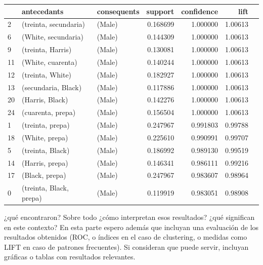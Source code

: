 \documentclass[sigconf]{acmart}
\begin{document}
\begin{table}[bt]
\begin{tabular}{lllrrrr}
\toprule
{} &              antecedants & consequents &   support &  confidence &  lift\\
\midrule
2  &    (treinta, secundaria) &      (Male) &  0.168699 &    1.000000 &  1.00613\\
6  &      (White, secundaria) &      (Male) &  0.144309 &    1.000000 &  1.00613 \\
9  &        (treinta, Harris) &      (Male) &  0.130081 &    1.000000 &  1.00613 \\
11 &        (White, cuarenta) &      (Male) &  0.140244 &    1.000000 &  1.00613 \\
12 &         (treinta, White) &      (Male) &  0.182927 &    1.000000 &  1.00613 \\
13 &      (secundaria, Black) &      (Male) &  0.117886 &    1.000000 &  1.00613 \\
20 &          (Harris, Black) &      (Male) &  0.142276 &    1.000000 &  1.00613\\
24 &        (cuarenta, prepa) &      (Male) &  0.156504 &    1.000000 &  1.00613 \\
1  &         (treinta, prepa) &      (Male) &  0.247967 &    0.991803 &  0.99788 \\
18 &           (White, prepa) &      (Male) &  0.225610 &    0.990991 &  0.99707 \\
5  &         (treinta, Black) &      (Male) &  0.186992 &    0.989130 &  0.99519 \\
14 &          (Harris, prepa) &      (Male) &  0.146341 &    0.986111 &  0.99216 \\
17 &           (Black, prepa) &      (Male) &  0.247967 &    0.983607 &  0.98964 \\
0  &  (treinta, Black, prepa) &      (Male) &  0.119919 &    0.983051 &  0.98908 \\
\bottomrule
\end{tabular}
\end{table}

¿qué encontraron? Sobre todo ¿cómo interpretan esos resultados? ¿qué significan en este contexto?  En esta parte espero además que incluyan una evaluación de los resultados obtenidos (ROC, o índices en el caso de clustering, o medidas como LIFT en caso de patrones frecuentes).  Si consideran que puede servir, incluyan gráficas o tablas con resultados relevantes. 
\end{document}
